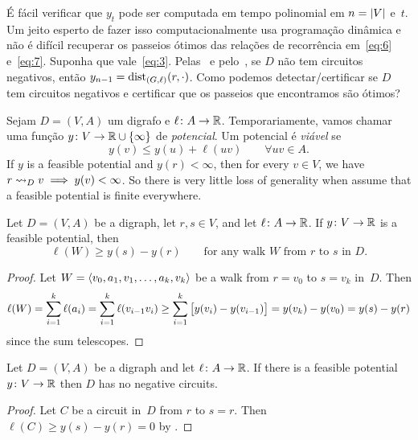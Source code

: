 \documentclass[10pt,reqno]{amsart}
\begin{document}
É fácil verificar que \(y_t\) pode ser computada em tempo polinomial em
\(n = \card{V}\) e~\(t\).  Um jeito esperto de fazer isso computacionalmente
usa programação dinâmica e não é difícil recuperar os passeios ótimos das 
relações de recorrência em~\eqref{eq:6} e~\eqref{eq:7}.
Suponha que vale~\eqref{eq:3}.  Pelas~
e pelo~, se \(D\) não tem circuitos negativos, então
\(y_{n-1} = \dist_{(G,\ell)}(r,\cdot)\).  Como podemos detectar/certificar
se \(D\) tem circuitos negativos e certificar que os passeios que encontramos
são ótimos?

Sejam \(D = (V,A)\) um digrafo e \(\ell \colon A \to \Reals\).
Temporariamente, vamos chamar uma função
\(y \colon V \to \Reals \cup \set{\infty}\) de \emph{potencial}.  Um
potencial é \emph{viável} se
\begin{equation*}
  y(v) \leq y(u) + \ell(uv)
  \qquad
  \forall uv \in A.
\end{equation*}
If \(y\) is a feasible potential and \(y(r) < \infty\), then for every
\(v \in V\), we have \(r \reaches_D v \implies y(v) < \infty\).  So
there is very little loss of generality when assume that a feasible
potential is finite everywhere.

\begin{theorem}
  \label{thm:1}
  Let \(D = (V,A)\) be a digraph, let \(r,s \in V\), and let
  \(\ell \colon A \to \Reals\).  If \(y \colon V \to \Reals\) is a
  feasible potential, then
  \begin{equation}
    \label{eq:10}
    \ell(W) \geq y(s) - y(r)
    \qquad
    \text{for any walk~\(W\) from~\(r\) to~\(s\) in~\(D\)}.
  \end{equation}
\end{theorem}
\begin{proof}
  Let \(W = \seq{v_0,a_1,v_1,\dotsc,a_k,v_k}\) be a walk from
  \(r = v_0\) to \(s = v_k\) in~\(D\).  Then
  \begin{equation*}
    \ell(W)
    =
    \sum_{i=1}^k \ell(a_i)
    =
    \sum_{i=1}^k \ell(v_{i-1}v_i)
    \geq
    \sum_{i=1}^k \sqbrac[\big]{y(v_i)-y(v_{i-1})}
    =
    y(v_k) - y(v_0)
    =
    y(s) - y(r)
  \end{equation*}
  since the sum telescopes.
\end{proof}

\begin{corollary}
  Let \(D = (V,A)\) be a digraph and let \(\ell \colon A \to \Reals\).
  If there is a feasible potential \(y \colon V \to \Reals\) then
  \(D\) has no negative circuits.
\end{corollary}
\begin{proof}
  Let \(C\) be a circuit in~\(D\) from \(r\) to \(s = r\).  Then
  \(\ell(C) \geq y(s) - y(r) = 0\) by .
\end{proof}
\end{document}
